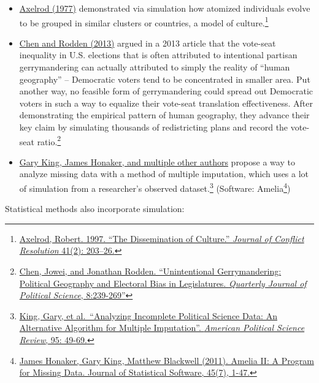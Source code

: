 \documentclass[]{book}
\newenvironment{Shaded}{\begin{snugshade}}{\end{snugshade}}
\providecommand{\tightlist}{%
  \setlength{\itemsep}{0pt}\setlength{\parskip}{0pt}}
\let\rmarkdownfootnote\footnote%
\def\footnote{\protect\rmarkdownfootnote}
\theoremstyle{definition}
\theoremstyle{definition}
\theoremstyle{definition}
\theoremstyle{remark}
\begin{document}
\begin{Shaded}
\begin{Highlighting}[]
\begin{Shaded}
\begin{Highlighting}[]
\begin{Shaded}
\begin{Highlighting}[]
\begin{itemize}
\tightlist
\item
  \href{http://www-personal.umich.edu/~axe/research/Dissemination.pdf}{Axelrod (1977)} demonstrated via simulation how atomized individuals evolve to be grouped in similar clusters or countries, a model of culture.\footnote{\href{http://www-personal.umich.edu/~axe/research/Dissemination.pdf}{Axelrod, Robert. 1997. ``The Dissemination of Culture.'' \emph{Journal of Conflict Resolution} 41(2): 203--26.}}
\item
  \href{http://www-personal.umich.edu/~jowei/florida.pdf}{Chen and Rodden (2013)} argued in a 2013 article that the vote-seat inequality in U.S. elections that is often attributed to intentional partisan gerrymandering can actually attributed to simply the reality of ``human geography'' -- Democratic voters tend to be concentrated in smaller area. Put another way, no feasible form of gerrymandering could spread out Democratic voters in such a way to equalize their vote-seat translation effectiveness. After demonstrating the empirical pattern of human geography, they advance their key claim by simulating thousands of redistricting plans and record the vote-seat ratio.\footnote{\href{http://www-personal.umich.edu/~jowei/florida.pdf}{Chen, Jowei, and Jonathan Rodden. ``Unintentional Gerrymandering: Political Geography and Electoral Bias in Legislatures. \emph{Quarterly Journal of Political Science}, 8:239-269''}}
\item
  \href{https://gking.harvard.edu/files/abs/evil-abs.shtml}{Gary King, James Honaker, and multiple other authors} propose a way to analyze missing data with a method of multiple imputation, which uses a lot of simulation from a researcher's observed dataset.\footnote{\href{https://gking.harvard.edu/files/abs/evil-abs.shtml}{King, Gary, et al.~``Analyzing Incomplete Political Science Data: An Alternative Algorithm for Multiple Imputation''. \emph{American Political Science Review}, 95: 49-69.}} (Software: Amelia\footnote{\href{http://www.jstatsoft.org/v45/i07/}{James Honaker, Gary King, Matthew Blackwell (2011). Amelia II: A Program for Missing Data. Journal of
    Statistical Software, 45(7), 1-47.}})
\end{itemize}

Statistical methods also incorporate simulation:


\end{Highlighting}
\end{Shaded}
\end{Highlighting}
\end{Shaded}
\end{Highlighting}
\end{Shaded}
\end{document}
